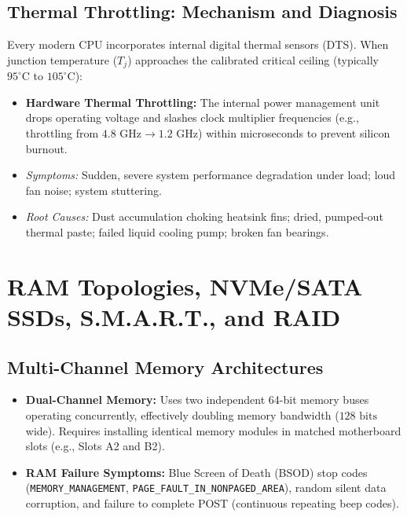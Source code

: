 \subsection{Thermal Throttling: Mechanism and Diagnosis}
Every modern CPU incorporates internal digital thermal sensors (DTS). When junction temperature ($T_j$) approaches the calibrated critical ceiling (typically $95^{\circ}\text{C}$ to $105^{\circ}\text{C}$):
\begin{itemize}
    \item \textbf{Hardware Thermal Throttling:} The internal power management unit drops operating voltage and slashes clock multiplier frequencies (e.g., throttling from $4.8\text{ GHz} \to 1.2\text{ GHz}$) within microseconds to prevent silicon burnout.
    \item \textit{Symptoms:} Sudden, severe system performance degradation under load; loud fan noise; system stuttering.
    \item \textit{Root Causes:} Dust accumulation choking heatsink fins; dried, pumped-out thermal paste; failed liquid cooling pump; broken fan bearings.
\end{itemize}


\section{RAM Topologies, NVMe/SATA SSDs, S.M.A.R.T., and RAID}
\label{sec:ram_storage_hw}

\subsection{Multi-Channel Memory Architectures}
\begin{itemize}
    \item \textbf{Dual-Channel Memory:} Uses two independent 64-bit memory buses operating concurrently, effectively doubling memory bandwidth ($128\text{ bits}$ wide). Requires installing identical memory modules in matched motherboard slots (e.g., Slots A2 and B2).
    \item \textbf{RAM Failure Symptoms:} Blue Screen of Death (BSOD) stop codes (\texttt{MEMORY\_MANAGEMENT}, \texttt{PAGE\_FAULT\_IN\_NONPAGED\_AREA}), random silent data corruption, and failure to complete POST (continuous repeating beep codes).
\end{itemize}

